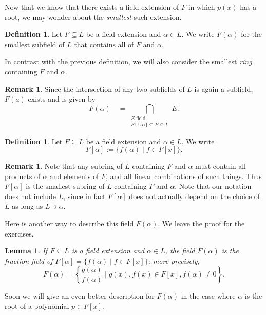 \documentclass[12pt]{report}
\newtheorem{lemma}[theorem]{Lemma}
\numberwithin{equation}{section}
\numberwithin{theorem}{chapter}
\theoremstyle{definition}
\newtheorem{definition}[theorem]{Definition}
\newtheorem*{basic properties}{Basic Properties}
\newtheorem*{Important Remark}{Important Remark}
\newtheorem{remark}[theorem]{Remark}
\begin{document}
Now that we know that there exists a field extension of $F$ in which $p(x)$ has a root, we may wonder about the {\em smallest} such extension.

\begin{definition}
Let $F \subseteq L$ be a field extension and $\alpha \in L$. We write $F(\alpha)$ for the smallest subfield of $L$ that contains all of $F$ and $\alpha$.
\end{definition}

In contrast with the previous definition, we will also consider the smallest \emph{ring} containing $F$ and $\alpha$.


\begin{remark}
Since the intersection of any two subfields of $L$ is again a subfield, $F(a)$ exists and is given by
$$F(\alpha) \quad = \bigcap_{\substack{E \text{ field } \\ F \cup \{ \alpha \}  \subseteq E   \subseteq  L}} E.$$
\end{remark}



\begin{definition}
	Let $F \subseteq L$ be a field extension and $\alpha \in L$. We write
	$$F[\alpha] := \{f(\alpha) \mid f\in F[x]\}.$$
\end{definition}

\begin{remark}
Note that any subring of $L$ containing $F$ and $\alpha$ must contain all products of $\alpha$ and elements of $F$, and all linear combinations of such things. Thus $F[\alpha]$ is the smallest subring of $L$ containing $F$ and $\alpha$. Note that our notation does not include $L$, since in fact $F[\alpha]$ does not actually depend on the choice of $L$ as long as $L \ni \alpha$.
\end{remark}



Here is another way to describe this field $F(\alpha)$. We leave the proof for the exercises.

\begin{lemma}\label{lemma description F(a)}
 If $F \subseteq L$ is a field extension and $\alpha \in L$, the field $F(\alpha)$ is the fraction field of $F[\alpha]=\{f(\alpha)\mid f\in F[x]\}$: more precisely,
$$F(\alpha) = \left\{ \frac{g(\alpha)}{f(\alpha)} \mid g(x), f(x) \in F[x], f(\alpha) \neq 0 \right\}.$$
\end{lemma}

Soon we will give an even better description for $F(\alpha)$ in the case where $\alpha$ is the root of a polynomial $p \in F[x]$.
\end{document}
